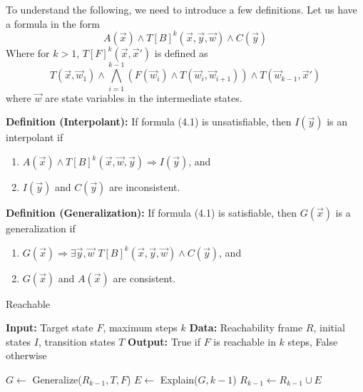\noindent To understand the following, we need to introduce a few definitions.
Let us have a formula in the form 
\begin{equation}
    A(\vec{x}) \wedge T[B]^k(\vec{x},\vec{y},\vec{w}) \wedge C(\vec{y})
\end{equation}
Where for \( k > 1 \), \( T[F]^k(\vec{x}, \vec{x}') \) is defined as
\begin{equation*}
    T(\vec{x}, \vec{w}_1) \land \bigwedge_{i=1}^{k-1} \left( F(\vec{w}_i) \land T(\vec{w}_i, \vec{w}_{i+1}) \right) \land T(\vec{w}_{k-1}, \vec{x}')
\end{equation*}
where $\vec{w}$ are state variables in the intermediate states.


\vspace{\baselineskip}\noindent    \textbf{Definition (Interpolant):} If formula (4.1) is unsatisfiable, then $I(\vec{y})$ is an interpolant if
    \begin{enumerate}
       \item \( A(\vec{x}) \land T[B]^k(\vec{x}, \vec{w}, \vec{y}) \Rightarrow I(\vec{y}) \), and
       \item \( I(\vec{y}) \) and \( C(\vec{y}) \) are inconsistent.
\end{enumerate}

\noindent    \textbf{Definition (Generalization):} If formula (4.1) is satisfiable, then $G(\vec{x})$ is a generalization if
    \begin{enumerate}
        \item $G(\vec{x}) \Rightarrow \exists \vec{y}, \vec{w}$  $T[B]^k(\vec{x}, \vec{y}, \vec{w}) \wedge C(\vec{y})$, and
        \item $G(\vec{x})$ and $A(\vec{x})$ are consistent.
\end{enumerate}

\newpage

\begin{algorithm}
\caption{Reachable}
\begin{algorithmic}[1]
\State \textbf{Input:} Target state $F$, maximum steps $k$
\State \textbf{Data:} Reachability frame $R$, initial states $I$, transition states $T$
\State \textbf{Output:} True if $F$ is reachable in $k$ steps, False otherwise

    \State {}
\EndIf

        \State $G \gets$ Generalize($R_{k-1}, T, F$)
            \State {}
        \Else
            \State $E \gets$ Explain($G, k-1$)
            \State $R_{k-1} \gets R_{k-1} \cup E$
        \EndIf
    \Else
        \State {}
    \EndIf
\EndWhile

\end{algorithmic}
\end{algorithm}

